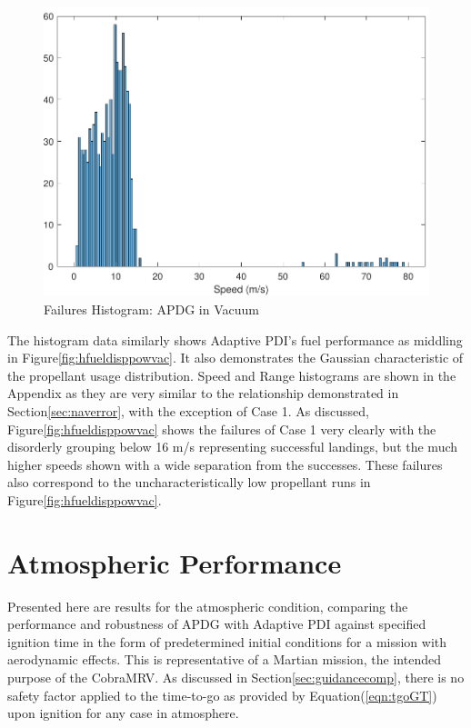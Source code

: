 \begin{figure}[H]
	\centering
	\begin{minipage}{4.3 in}
		\includegraphics[width=\linewidth]{Figures/hspdfaildisppowvac.pdf}
		\caption{Failures Histogram: APDG in Vacuum \label{fig:hspdfaildisppowvac} }
	\end{minipage}
\end{figure}

The histogram data similarly shows Adaptive PDI's fuel performance as middling in Figure\:\ref{fig:hfueldisppowvac}. It also demonstrates the Gaussian characteristic of the propellant usage distribution. Speed and Range histograms are shown in the Appendix as they are very similar to the relationship demonstrated in Section\:\ref{sec:naverror}, with the exception of Case 1. As discussed, Figure\:\ref{fig:hfueldisppowvac} shows the failures of Case 1 very clearly with the disorderly grouping below 16 m/s representing successful landings, but the much higher speeds shown with a wide separation from the successes. These failures also correspond to the uncharacteristically low propellant runs in Figure\:\ref{fig:hfueldisppowvac}.


\section{Atmospheric Performance} \label{sec:atmoperf}

Presented here are results for the atmospheric condition, comparing the performance and robustness of APDG with Adaptive PDI against specified ignition time in the form of predetermined initial conditions for a mission with aerodynamic effects. This is representative of a Martian mission, the intended purpose of the CobraMRV. As discussed in Section\:\ref{sec:guidancecomp}, there is no safety factor applied to the time-to-go as provided by Equation\:(\ref{eqn:tgoGT}) upon ignition for any case in atmosphere. 

